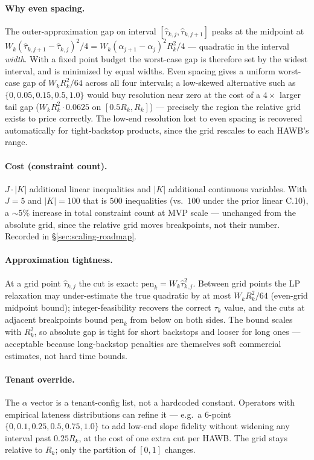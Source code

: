 \documentclass[11pt,a4paper]{article}
\theoremstyle{definition}
\begin{document}
\paragraph{Why even spacing.}
The outer-approximation gap on interval $[\hat\tau_{k,j}, \hat\tau_{k,j+1}]$
peaks at the midpoint at $W_k (\hat\tau_{k,j+1} - \hat\tau_{k,j})^2 / 4
= W_k (\alpha_{j+1} - \alpha_j)^2 R_k^2 / 4$ --- quadratic in the interval
\emph{width}. With a fixed point budget the worst-case gap is therefore set by
the widest interval, and is minimized by equal widths. Even spacing gives a
uniform worst-case gap of $W_k R_k^2 / 64$ across all four intervals; a
low-skewed alternative such as $\{0, 0.05, 0.15, 0.5, 1.0\}$ would buy
resolution near zero at the cost of a $4\times$ larger tail gap
($W_k R_k^2 \cdot 0.0625$ on $[0.5 R_k, R_k]$) --- precisely the region the
relative grid exists to price correctly. The low-end resolution lost to even
spacing is recovered automatically for tight-backstop products, since the
grid rescales to each HAWB's range.

\paragraph{Cost (constraint count).}
$J \cdot |K|$ additional linear inequalities and $|K|$ additional continuous
variables. With $J = 5$ and $|K| = 100$ that is $500$ inequalities (vs.\ $100$
under the prior linear C.10), a $\sim 5\%$ increase in total constraint count
at MVP scale --- unchanged from the absolute grid, since the relative grid
moves breakpoints, not their number. Recorded in \S\ref{sec:scaling-roadmap}.

\paragraph{Approximation tightness.}
At a grid point $\hat\tau_{k,j}$ the cut is exact: $\text{pen}_k = W_k
\hat\tau_{k,j}^2$. Between grid points the LP relaxation may under-estimate the
true quadratic by at most $W_k R_k^2 / 64$ (even-grid midpoint bound);
integer-feasibility recovers the correct $\tau_k$ value, and the cuts at
adjacent breakpoints bound $\text{pen}_k$ from below on both sides. The bound
scales with $R_k^2$, so absolute gap is tight for short backstops and looser
for long ones --- acceptable because long-backstop penalties are themselves
soft commercial estimates, not hard time bounds.

\paragraph{Tenant override.}
The $\alpha$ vector is a tenant-config list, not a hardcoded constant.
Operators with empirical lateness distributions can refine it --- e.g.\ a
6-point $\{0, 0.1, 0.25, 0.5, 0.75, 1.0\}$ to add low-end slope fidelity
without widening any interval past $0.25 R_k$, at the cost of one extra cut
per HAWB. The grid stays relative to $R_k$; only the partition of $[0,1]$
changes.
\end{document}
